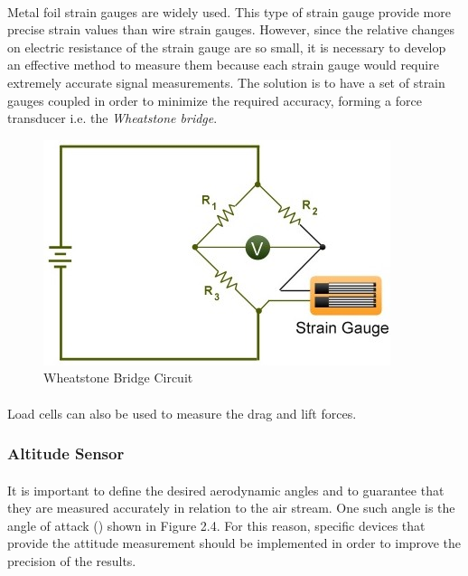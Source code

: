 \paragraph{}Metal foil strain gauges are widely used. This type of strain gauge provide more precise strain values than wire strain gauges. However, since the relative changes on electric resistance of the strain gauge are so small, it is necessary to develop an effective method to measure them because each strain gauge would require extremely accurate signal measurements. The solution is to have a set of strain gauges coupled in order to minimize the required accuracy, forming a force transducer i.e. the \textit{Wheatstone bridge}.
	\begin{figure}[!h]
	\includegraphics{Figures/Fig9}
	\caption{Wheatstone Bridge Circuit}
	\end{figure}
\paragraph{}Load cells can also be used to measure the drag and lift forces.
\subsubsection{Altitude Sensor}
\paragraph{}It is important to define the desired aerodynamic angles and to guarantee that they are measured accurately in relation to the air stream. One such angle is the angle of attack (\textalpha) shown in Figure 2.4. For this reason, specific devices that provide the attitude measurement should be implemented in order to improve the precision of the results.
